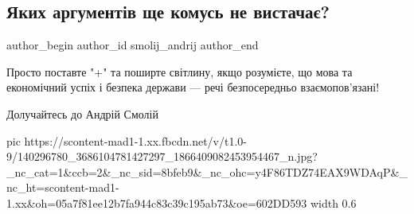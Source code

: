  
 
 
 
 
\subsection{Яких аргументів ще комусь не вистачає?}
\label{sec:19_01_2021.fb.andrii_smolii.1.mova}
\ifcmt
  author_begin
   author_id smolij_andrij
  author_end
\fi

Просто поставте "+" та поширте світлину, якщо розумієте, що мова та економічний
успіх і безпека держави — речі безпосередньо взаємопов'язані!

Долучайтесь до Андрій Смолій

\ifcmt
  pic https://scontent-mad1-1.xx.fbcdn.net/v/t1.0-9/140296780_3686104781427297_1866409082453954467_n.jpg?_nc_cat=1&ccb=2&_nc_sid=8bfeb9&_nc_ohc=y4F86TDZ74EAX9WDAqP&_nc_ht=scontent-mad1-1.xx&oh=05a7f81ee12b7fa944c83c39c195ab73&oe=602DD593
  width 0.6
\fi

